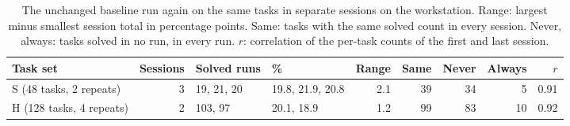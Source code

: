 \begin{table}[t]
\centering
\footnotesize
\caption{The unchanged baseline run again on the same tasks in separate sessions on the workstation. Range: largest minus smallest session total in percentage points. Same: tasks with the same solved count in every session. Never, always: tasks solved in no run, in every run. $r$: correlation of the per-task counts of the first and last session.}
\label{tab:repeat}
\begin{tabular}{lrllrrrrr}
\toprule
Task set & Sessions & Solved runs & \% & Range & Same & Never & Always & $r$ \\
\midrule
S (48 tasks, 2 repeats) & 3 & 19, 21, 20 & 19.8, 21.9, 20.8 & 2.1 & 39 & 34 & 5 & 0.91 \\
H (128 tasks, 4 repeats) & 2 & 103, 97 & 20.1, 18.9 & 1.2 & 99 & 83 & 10 & 0.92 \\
\bottomrule
\end{tabular}
\end{table}
